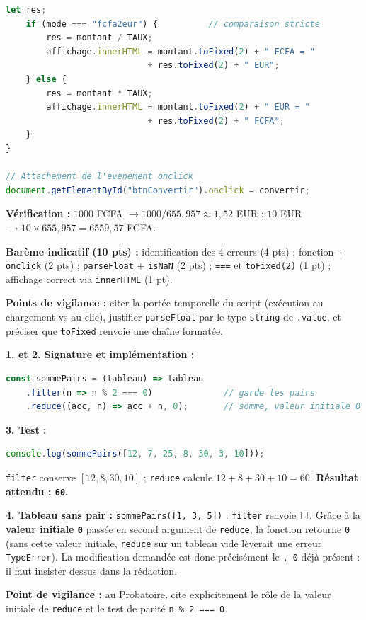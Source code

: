 \documentclass[11pt]{article}
\begin{document}
\begin{corrige}
\begin{lstlisting}[language=JavaScript]
    let res;
    if (mode === "fcfa2eur") {          // comparaison stricte
        res = montant / TAUX;
        affichage.innerHTML = montant.toFixed(2) + " FCFA = "
                            + res.toFixed(2) + " EUR";
    } else {
        res = montant * TAUX;
        affichage.innerHTML = montant.toFixed(2) + " EUR = "
                            + res.toFixed(2) + " FCFA";
    }
}

// Attachement de l'evenement onclick
document.getElementById("btnConvertir").onclick = convertir;
\end{lstlisting}
\textbf{Vérification :} $1000$ FCFA $\to 1000 / 655{,}957 \approx 1{,}52$ EUR ; $10$ EUR $\to 10 \times 655{,}957 = 6559{,}57$ FCFA.

\textbf{Barème indicatif (10 pts) :} identification des 4 erreurs (4 pts) ; fonction + \texttt{onclick} (2 pts) ; \texttt{parseFloat} + \texttt{isNaN} (2 pts) ; \texttt{===} et \texttt{toFixed(2)} (1 pt) ; affichage correct via \texttt{innerHTML} (1 pt).

\textbf{Points de vigilance :} citer la portée temporelle du script (exécution au chargement vs au clic), justifier \texttt{parseFloat} par le type \texttt{string} de \texttt{.value}, et préciser que \texttt{toFixed} renvoie une chaîne formatée.
\end{corrige}

\begin{corrige}
\textbf{1. et 2. Signature et implémentation :}
\begin{lstlisting}[language=JavaScript]
const sommePairs = (tableau) => tableau
    .filter(n => n % 2 === 0)              // garde les pairs
    .reduce((acc, n) => acc + n, 0);       // somme, valeur initiale 0
\end{lstlisting}
\textbf{3. Test :}
\begin{lstlisting}[language=JavaScript]
console.log(sommePairs([12, 7, 25, 8, 30, 3, 10]));
\end{lstlisting}
\texttt{filter} conserve $[12, 8, 30, 10]$ ; \texttt{reduce} calcule $12 + 8 + 30 + 10 = 60$. \textbf{Résultat attendu : \texttt{60}.}

\textbf{4. Tableau sans pair :} \texttt{sommePairs([1, 3, 5])} : \texttt{filter} renvoie \texttt{[]}. Grâce à la \textbf{valeur initiale \texttt{0}} passée en second argument de \texttt{reduce}, la fonction retourne \texttt{0} (sans cette valeur initiale, \texttt{reduce} sur un tableau vide lèverait une erreur \texttt{TypeError}). La modification demandée est donc précisément le \texttt{, 0} déjà présent : il faut insister dessus dans la rédaction.

\textbf{Point de vigilance :} au Probatoire, cite explicitement le rôle de la valeur initiale de \texttt{reduce} et le test de parité \texttt{n \% 2 === 0}.
\end{corrige}
\end{document}
